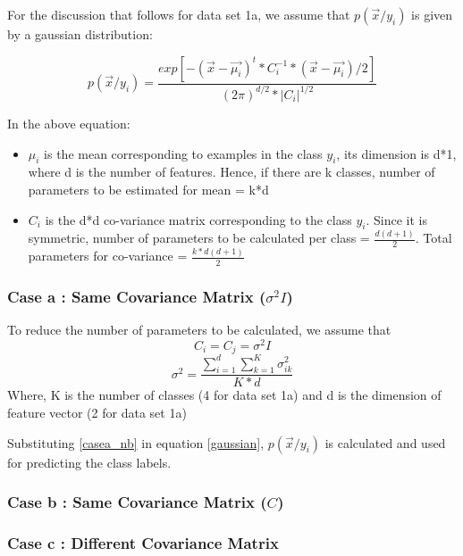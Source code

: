\documentclass[11pt,a4paper]{article}
\newcommand{\noi}{\noindent}
\begin{document}
\noi
For the discussion that follows for data set 1a, we assume that $p(\vec{x}/y_{i})$ is given by a gaussian distribution:

\begin{equation}
\label{gaussian}
    p(\vec{x}/y_{i})=\frac{exp[-(\vec{x}-\vec{\mu_{i}})^{t}*C_{i}^{-1}*(\vec{x}-\vec{\mu_{i}})/2]}{(2\pi)^{d/2}*|C_{i}|^{1/2}}
\end{equation}

\noi
In the above equation: 

\begin{itemize}
    \item $\mu_{i}$ is the mean corresponding to examples in the class $y_{i}$, its dimension is d*1, where d is the number of features. Hence, if there are k classes, number of parameters to be estimated for mean = k*d
    \item $C_{i}$ is the d*d co-variance matrix corresponding to the class $y_{i}$. Since it is symmetric, number of parameters to be calculated per class = $\frac{d(d+1)}{2}$. Total parameters for co-variance = $\frac{k*d(d+1)}{2}$
\end{itemize}

\subsubsection{ Case a : Same Covariance Matrix ($\sigma^2I$)}

To reduce the number of parameters to be calculated, we assume that
\begin{equation}
    C_{i}=C_{j}=\sigma^{2}I
\end{equation}
\begin{equation}
\label{casea_nb}
    \sigma^{2}=\frac{\sum_{i=1}^{d}\sum_{k=1}^{K}\sigma^{2}_{ik}}{K*d}
\end{equation}
Where, K is the number of classes (4 for data set 1a) and d is the dimension of feature vector (2 for data set 1a)

Substituting \ref{casea_nb} in equation \ref{gaussian}, $p(\vec{x}/y_{i})$ is calculated and used for predicting the class labels. 

\subsubsection{ Case b : Same Covariance Matrix ($C$)}
\subsubsection{ Case c : Different Covariance Matrix}
\end{document}
